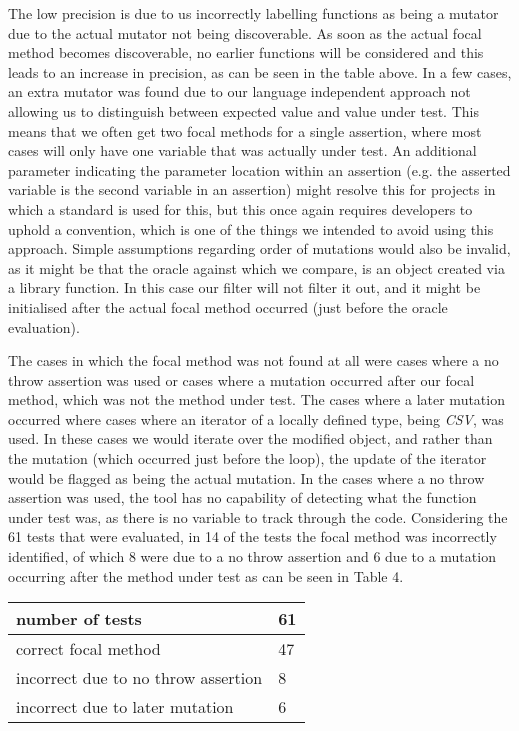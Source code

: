 \documentclass[11pt]{article}
\begin{document}
\begin{multicols}{2}
The low precision is due to us incorrectly labelling functions as being a mutator due to the actual mutator not being discoverable. As soon as the actual focal method becomes discoverable, no earlier functions will be considered and this leads to an increase in precision, as can be seen in the table above. In a few cases, an extra mutator was found due to our language independent approach not allowing us to distinguish between expected value and value under test. This means that we often get two focal methods for a single assertion, where most cases will only have one variable that was actually under test. An additional parameter indicating the parameter location within an assertion (e.g. the asserted variable is the second variable in an assertion) might resolve this for projects in which a standard is used for this, but this once again requires developers to uphold a convention, which is one of the things we intended to avoid using this approach. Simple assumptions regarding order of mutations would also be invalid, as it might be that the oracle against which we compare, is an object created via a library function. In this case our filter will not filter it out, and it might be initialised after the actual focal method occurred (just before the oracle evaluation).

The cases in which the focal method was not found at all were cases where a no throw assertion was used or cases where a mutation occurred after our focal method, which was not the method under test. The cases where a later mutation occurred where cases where an iterator of a locally defined type, being \textit{CSV}, was used. In these cases we would iterate over the modified object, and rather than the mutation (which occurred just before the loop), the update of the iterator would be flagged as being the actual mutation. In the cases where a no throw assertion was used, the tool has no capability of detecting what the function under test was, as there is no variable to track through the code. Considering the 61 tests that were evaluated, in 14 of the tests the focal method was incorrectly identified, of which 8 were due to a no throw assertion and 6 due to a mutation occurring after the method under test as can be seen in Table 4.

\begin{center}
	\begin{tabular}{ |p{6.5cm}|p{0.5cm}|  }
		\hline
		number of tests & \hfil61 \\
		\hline
		correct focal method & \hfil47\\
		\hline
		incorrect due to no throw assertion  & \hfil8\\
		\hline
		incorrect due to later mutation & \hfil6\\
		\hline
	\end{tabular}
\end{center}


\end{multicols}
\end{document}
